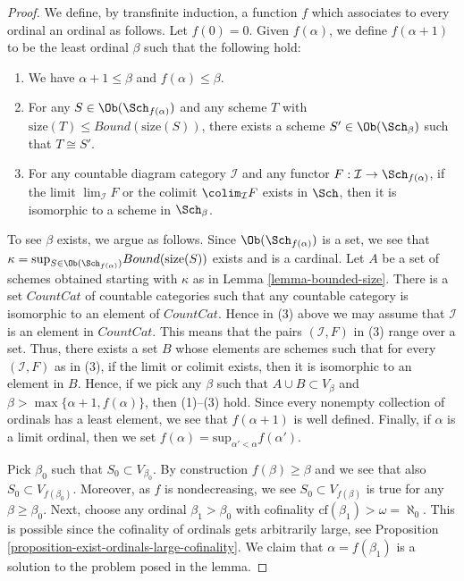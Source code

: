 \begin{proof}
We define, by transfinite induction, a function $f$ which associates
to every ordinal an ordinal as follows. Let $f(0) = 0$.
Given $f(\alpha)$, we define $f(\alpha + 1)$ to be the least
ordinal $\beta$ such that the following hold:
\begin{enumerate}
\item We have $\alpha + 1 \leq \beta$ and $f(\alpha) \leq \beta$.
\item For any $S \in \Ob(\Sch_{f(\alpha)})$ and any
scheme $T$ with $\text{size}(T) \leq Bound(\text{size}(S))$,
there exists a scheme $S' \in \Ob(\Sch_\beta)$
such that $T \cong S'$.
\item For any countable diagram category $\mathcal{I}$ and
any functor $F : \mathcal{I} \to \Sch_{f(\alpha)}$, if
the limit $\lim_\mathcal{I} F$ or the colimit
$\colim_\mathcal{I} F$ exists in $\Sch$,
then it is isomorphic to a scheme in $\Sch_\beta$.
\end{enumerate}
To see $\beta$ exists, we argue as follows. Since
$\Ob(\Sch_{f(\alpha)})$ is a set, we see that
$\kappa =
\text{sup}_{S \in \Ob(\Sch_{f(\alpha)})} Bound(\text{size}(S))$
exists and is a cardinal.
Let $A$ be a set of schemes obtained starting with $\kappa$
as in Lemma \ref{lemma-bounded-size}.
There is a set $CountCat$ of countable
categories such that any countable category is isomorphic to
an element of $CountCat$. Hence in (3) above we may assume
that $\mathcal{I}$ is an element in $CountCat$. This means that
the pairs $(\mathcal{I}, F)$ in (3) range over a set.
Thus, there exists a set $B$ whose elements are schemes
such that for every $(\mathcal{I}, F)$ as in (3), if the
limit or colimit exists, then it is isomorphic to an element in $B$.
Hence, if we pick any $\beta$ such that $A \cup B \subset V_\beta$
and $\beta > \max\{\alpha + 1, f(\alpha)\}$, then (1)--(3) hold.
Since every nonempty collection of ordinals has a least element,
we see that $f(\alpha + 1)$ is well defined. Finally, if $\alpha$
is a limit ordinal, then we set
$f(\alpha) = \text{sup}_{\alpha' < \alpha} f(\alpha')$.

\medskip\noindent
Pick $\beta_0$ such that $S_0 \subset V_{\beta_0}$.
By construction $f(\beta) \geq \beta$ and we see that
also $S_0 \subset V_{f(\beta_0)}$. Moreover, as $f$ is
nondecreasing, we see $S_0 \subset V_{f(\beta)}$ is true for any
$\beta \geq \beta_0$.
Next, choose any ordinal $\beta_1 > \beta_0$ with cofinality
$\text{cf}(\beta_1) > \omega = \aleph_0$. This is possible
since the cofinality of ordinals gets arbitrarily large, see
Proposition \ref{proposition-exist-ordinals-large-cofinality}.
We claim that
$\alpha = f(\beta_1)$ is a solution to the problem posed in the lemma.


\end{proof}
